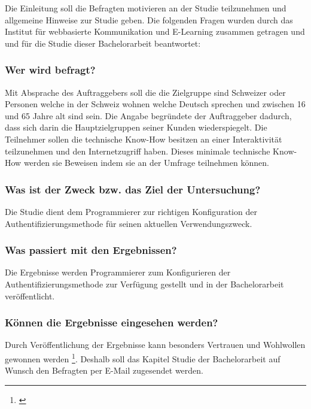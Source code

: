 Die Einleitung soll die Befragten motivieren an der Studie teilzunehmen
und allgemeine Hinweise zur Studie geben. Die folgenden Fragen wurden
durch das Institut für webbasierte Kommunikation und E-Learning zusammen
getragen \autocite{fragebogen} und und für die Studie dieser
Bachelorarbeit beantwortet:

\subsubsection{Wer wird befragt?}\label{wer-wird-befragt}

Mit Absprache des Auftraggebers soll die die Zielgruppe sind Schweizer
oder Personen welche in der Schweiz wohnen welche Deutsch sprechen und
zwischen 16 und 65 Jahre alt sind sein. Die Angabe begründete der
Auftraggeber dadurch, dass sich darin die Hauptzielgruppen seiner Kunden
wiederspiegelt. Die Teilnehmer sollen die technische Know-How besitzen
an einer Interaktivität teilzunehmen und den Internetzugriff haben.
Dieses minimale technische Know-How werden sie Beweisen indem sie an der
Umfrage teilnehmen können.

\subsubsection{Was ist der Zweck bzw. das Ziel der
Untersuchung?}\label{was-ist-der-zweck-bzw.-das-ziel-der-untersuchung}

Die Studie dient dem Programmierer zur richtigen Konfiguration der
Authentifizierungsmethode für seinen aktuellen Verwendungszweck.

\subsubsection{Was passiert mit den
Ergebnissen?}\label{was-passiert-mit-den-ergebnissen}

Die Ergebnisse werden Programmierer zum Konfigurieren der
Authentifizierungsmethode zur Verfügung gestellt und in der
Bachelorarbeit veröffentlicht.

\subsubsection{Können die Ergebnisse eingesehen
werden?}\label{kuxf6nnen-die-ergebnisse-eingesehen-werden}

Durch Veröffentlichung der Ergebnisse kann besonders Vertrauen und
Wohlwollen gewonnen werden \footnote{\autocite{fragebogen}}. Deshalb
soll das Kapitel Studie der Bachelorarbeit auf Wunsch den Befragten per
E-Mail zugesendet werden.

